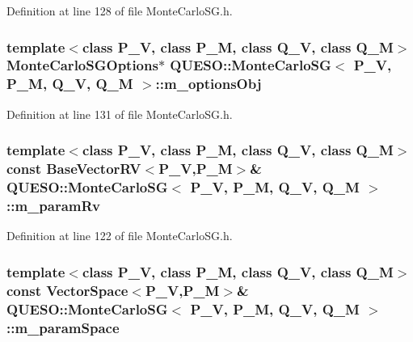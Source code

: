 Definition at line 128 of file Monte\-Carlo\-S\-G.\-h.

\hypertarget{class_q_u_e_s_o_1_1_monte_carlo_s_g_acf7ce935648fd3a5d0ee23685708b4ca}{
\subsubsection[{m\-\_\-options\-Obj}]{\setlength{\rightskip}{0pt plus 5cm}template$<$class P\-\_\-\-V, class P\-\_\-\-M, class Q\-\_\-\-V, class Q\-\_\-\-M$>$ {\bf Monte\-Carlo\-S\-G\-Options}$\ast$ {\bf Q\-U\-E\-S\-O\-::\-Monte\-Carlo\-S\-G}$<$ P\-\_\-\-V, P\-\_\-\-M, Q\-\_\-\-V, Q\-\_\-\-M $>$\-::m\-\_\-options\-Obj\hspace{0.3cm}{\ttfamily [private]}}}\label{class_q_u_e_s_o_1_1_monte_carlo_s_g_acf7ce935648fd3a5d0ee23685708b4ca}


Definition at line 131 of file Monte\-Carlo\-S\-G.\-h.

\hypertarget{class_q_u_e_s_o_1_1_monte_carlo_s_g_a938acc7072543d727fe35fa0f5d9013f}{
\subsubsection[{m\-\_\-param\-Rv}]{\setlength{\rightskip}{0pt plus 5cm}template$<$class P\-\_\-\-V, class P\-\_\-\-M, class Q\-\_\-\-V, class Q\-\_\-\-M$>$ const {\bf Base\-Vector\-R\-V}$<$P\-\_\-\-V,P\-\_\-\-M$>$\& {\bf Q\-U\-E\-S\-O\-::\-Monte\-Carlo\-S\-G}$<$ P\-\_\-\-V, P\-\_\-\-M, Q\-\_\-\-V, Q\-\_\-\-M $>$\-::m\-\_\-param\-Rv\hspace{0.3cm}{\ttfamily [private]}}}\label{class_q_u_e_s_o_1_1_monte_carlo_s_g_a938acc7072543d727fe35fa0f5d9013f}


Definition at line 122 of file Monte\-Carlo\-S\-G.\-h.

\hypertarget{class_q_u_e_s_o_1_1_monte_carlo_s_g_a64620f0dd80c96f86918e1d711767b6f}{
\subsubsection[{m\-\_\-param\-Space}]{\setlength{\rightskip}{0pt plus 5cm}template$<$class P\-\_\-\-V, class P\-\_\-\-M, class Q\-\_\-\-V, class Q\-\_\-\-M$>$ const {\bf Vector\-Space}$<$P\-\_\-\-V,P\-\_\-\-M$>$\& {\bf Q\-U\-E\-S\-O\-::\-Monte\-Carlo\-S\-G}$<$ P\-\_\-\-V, P\-\_\-\-M, Q\-\_\-\-V, Q\-\_\-\-M $>$\-::m\-\_\-param\-Space\hspace{0.3cm}{\ttfamily [private]}}}\label{class_q_u_e_s_o_1_1_monte_carlo_s_g_a64620f0dd80c96f86918e1d711767b6f}


